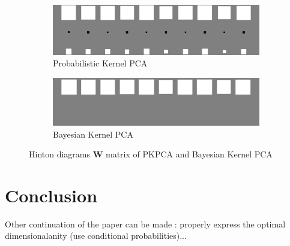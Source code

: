 \documentclass{article}
\begin{document}
\begin{figure}[ht]
    \centering
    \begin{subfigure}{.5\textwidth}
      \centering
      \includegraphics[width=.8\linewidth]{img/hinton_pkpca.png}
      \caption{Probabilistic Kernel PCA}
      \label{fig:pkpca_hinton}
    \end{subfigure}%
    \begin{subfigure}{.5\textwidth}
      \centering
      \includegraphics[width=.8\linewidth]{img/hinton_bkpca.png}
      \caption{Bayesian Kernel PCA}
      \label{fig:bayesk_hinton}
    \end{subfigure}
    \caption{Hinton diagrams $\mathbf{W}$ matrix of PKPCA and Bayesian Kernel PCA}
    \label{fig:hinton_kpca}
\end{figure}

\section{Conclusion}

Other continuation of the paper can be made : properly express the optimal dimensionalanity (use conditional probabilities)...


\end{document}
